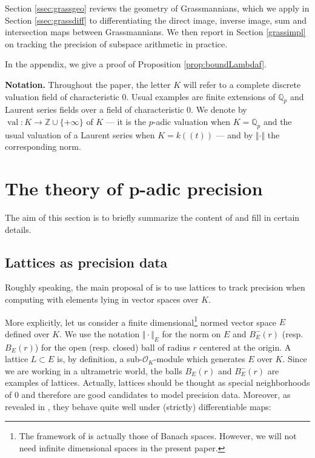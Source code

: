 \documentclass{sig-alternate}
\DeclareMathOperator{\val}{val}
\newcommand{\Z}{\mathbb Z}
\newcommand{\Q}{\mathbb Q}
\newcommand{\Qp}{\Q_p}
\renewcommand{\O}{\mathcal O}
\begin{document}
Section \ref{ssec:grassgeo} reviews the geometry of Grassmannians,
which we apply in Section \ref{ssec:grassdiff} to differentiating
the direct image, inverse image, sum and intersection maps
between Grassmannians.  We then report in Section \ref{grassimpl}
on tracking the precision of subspace arithmetic in practice.

In the appendix, we give a proof of Proposition \ref{prop:boundLambdaf}.

\smallskip

\noindent
{\bf Notation.}
Throughout the paper, the letter $K$ will refer to a complete discrete 
valuation field of characteristic $0$. Usual examples are finite 
extensions of $\Qp$ and Laurent series fields over a field of 
characteristic $0$. We denote by $\val : K \to \Z \cup \{+\infty\}$ of 
$K$ --- it is the $p$-adic valuation when $K = \Qp$ and the usual 
valuation of a Laurent series when $K = k((t))$ --- and by $\Vert \cdot 
\Vert$ the corresponding norm.

\section{The theory of p-adic precision}
\label{sec:theory}

The aim of this section is to briefly summarize the content of 
\cite{caruso-roe-vaccon:14a} and fill in certain details.

\subsection{Lattices as precision data}
\label{ssec:latticeprec}

Roughly speaking, the main proposal of \cite{caruso-roe-vaccon:14a} is 
to use lattices to track precision when computing with elements lying in 
vector spaces over $K$.

More explicitly, let us consider a finite 
dimensional\footnote{The framework of \cite{caruso-roe-vaccon:14a} is 
actually those of Banach spaces. However, we will not need infinite 
dimensional spaces in the present paper.} normed vector space $E$ 
defined over $K$. We use the notation $\Vert \cdot \Vert_E$ for the norm 
on $E$ and $B^-_E(r)$ (resp. $B^{\phantom -}_E(r)$) for the open (resp. 
closed) ball of radius $r$ centered at the origin. A lattice $L \subset 
E$ is, by definition, a sub-$\O_K$-module which generates $E$ over $K$. 
Since we are working in a ultrametric world, the balls $B^{\phantom 
-}_E(r)$ and $B^-_E(r)$ are examples of lattices. Actually, lattices 
should be thought as special neighborhoods of $0$ and therefore are good 
candidates to model precision data. Moreover, as revealed in 
\cite{caruso-roe-vaccon:14a}, they behave quite well under (strictly) 
differentiable maps:
\end{document}

